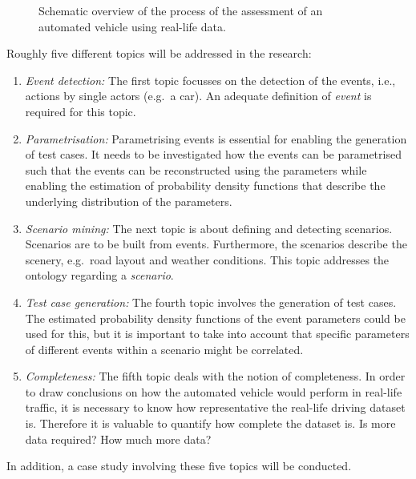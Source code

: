 \documentclass[10pt,final,a4paper,oneside,onecolumn]{article}
\begin{document}
\begin{figure}[b]
\begin{center}
		\vspace{-1.5em}
		\caption{Schematic overview of the process of the assessment of an automated vehicle using real-life data.}
		\label{fig:scheme}
	\end{center}
\end{figure}

Roughly five different topics will be addressed in the research:
\begin{enumerate}
	\item \emph{Event detection:}\,\,The first topic focusses on the detection of the events, i.e., actions by single actors (e.g.\ a car). An adequate definition of \emph{event} is required for this topic.
	\item \emph{Parametrisation:}\,\,Parametrising events is essential for enabling the generation of test cases. It needs to be investigated how the events can be parametrised such that the events can be reconstructed using the parameters while enabling the estimation of probability density functions that describe the underlying distribution of the parameters.
	\item \emph{Scenario mining:}\,\,The next topic is about defining and detecting scenarios. Scenarios are to be built from events. Furthermore, the scenarios describe the scenery, e.g.\ road layout and weather conditions. This topic addresses the ontology regarding a \emph{scenario}.
	\item \emph{Test case generation:}\,\,The fourth topic involves the generation of test cases. The estimated probability density functions of the event parameters could be used for this, but it is important to take into account that specific parameters of different events within a scenario might be correlated.
	\item \emph{Completeness:}\,\,The fifth topic deals with the notion of completeness. In order to draw conclusions on how the automated vehicle would perform in real-life traffic, it is necessary to know how representative the real-life driving dataset is. Therefore it is valuable to quantify how complete the dataset is. Is more data required? How much more data?
\end{enumerate}

In addition, a case study involving these five topics will be conducted.
\end{document}
